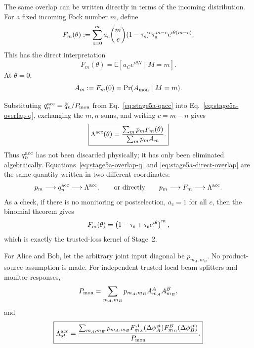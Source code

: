 \documentclass[11pt]{article}
\theoremstyle{remark}
\begin{document}
The same overlap can be written directly in terms of the incoming
distribution.  For a fixed incoming Fock number \(m\), define
\begin{equation}
    F_m(\theta)
    :=
    \sum_{c=0}^{m}
      a_c
      \binom mc
      (1-\tau_{\rm s})^c
      \tau_{\rm s}^{m-c}
      e^{i\theta(m-c)}.
    \label{eq:stage5a-Fm}
\end{equation}
This has the direct interpretation
\begin{equation}
    F_m(\theta)
    =
    \mathbb E\!\left[
      a_C e^{i\theta N}
      \mid M=m
    \right].
    \label{eq:stage5a-Fm-expectation}
\end{equation}
At \(\theta=0\),
\begin{equation}
    A_m
    :=
    F_m(0)
    =
    \Pr(A_{\rm mon}\mid M=m).
    \label{eq:stage5a-Am}
\end{equation}

Substituting \(q_n^{\rm acc}=\widetilde q_n/P_{\rm mon}\) from
Eq.~\eqref{eq:stage5a-qacc} into Eq.~\eqref{eq:stage5a-overlap-q}, exchanging
the \(m,n\) sums, and writing \(c=m-n\) gives
\begin{equation}
    \boxed{
    \Lambda^{\rm acc}(\theta)
    =
    \frac{
      \sum_m p_mF_m(\theta)
    }{
      \sum_m p_mA_m
    }.
    }
    \label{eq:stage5a-direct-overlap}
\end{equation}
Thus \(q_n^{\rm acc}\) has not been discarded physically; it has only been
eliminated algebraically.  Equations~\eqref{eq:stage5a-overlap-q} and
\eqref{eq:stage5a-direct-overlap} are the same quantity written in two
different coordinates:
\[
    p_m
    \longrightarrow
    q_n^{\rm acc}
    \longrightarrow
    \Lambda^{\rm acc},
    \qquad\text{or directly}\qquad
    p_m
    \longrightarrow
    F_m
    \longrightarrow
    \Lambda^{\rm acc}.
\]
As a check, if there is no monitoring or postselection, \(a_c=1\) for all
\(c\), then the binomial theorem gives
\begin{equation}
    F_m(\theta)
    =
    \left(
      1-\tau_{\rm s}
      +\tau_{\rm s}e^{i\theta}
    \right)^m,
    \label{eq:stage5a-Fm-no-monitor}
\end{equation}
which is exactly the trusted-loss kernel of Stage~2.

For Alice and Bob, let the arbitrary joint input diagonal be
\(p_{m_A,m_B}\).  No product-source assumption is made.  For independent
trusted local beam splitters and monitor responses,
\begin{equation}
    P_{\rm mon}
    =
    \sum_{m_A,m_B}
      p_{m_A,m_B}
      A^A_{m_A}A^B_{m_B},
    \label{eq:stage5a-pmon-twoarm}
\end{equation}
and
\begin{equation}
    \boxed{
    \Lambda_{st}^{\rm acc}
    =
    \frac{
      \sum_{m_A,m_B}
      p_{m_A,m_B}
      F^A_{m_A}(\Delta\phi_A^{st})
      F^B_{m_B}(\Delta\phi_B^{st})
    }{
      P_{\rm mon}
    }.
    }
    \label{eq:stage5a-overlap-twoarm}
\end{equation}
\end{document}
